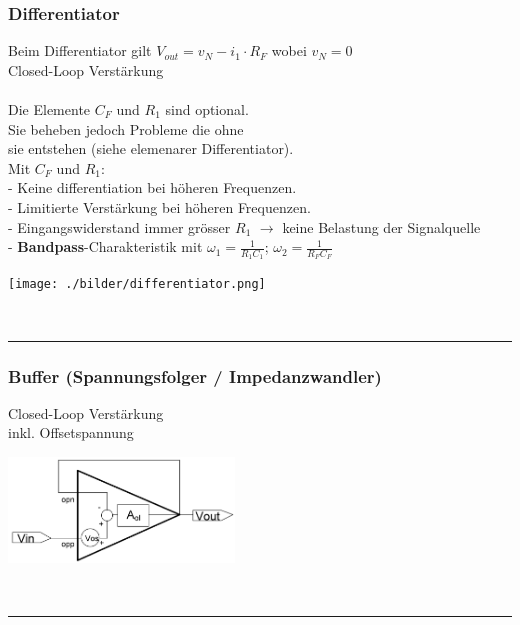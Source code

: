   \subsubsection{Differentiator}
    \begin{minipage}[T]{13cm}
      Beim Differentiator gilt $V_{out}=v_N-i_1 \cdot R_F$ wobei $v_N=0$\\
      Closed-Loop Verst\"arkung
      \hspace{3mm}\\
      \hspace*{43.2mm}\\
      Die Elemente $C_F$ und $R_1$ sind optional. \\
      Sie beheben jedoch Probleme die ohne \\
      sie entstehen (siehe elemenarer Differentiator). \\
      Mit $C_F$ und $R_1$: \\
      - Keine differentiation bei h\"oheren Frequenzen. \\
      - Limitierte Verst\"arkung bei h\"oheren Frequenzen. \\
      - Eingangswiderstand immer gr\"osser $R_1$ $\rightarrow$ keine Belastung der Signalquelle\\
      - \textbf{Bandpass}-Charakteristik mit $\omega_1 = \frac{1}{R_1C_1}$; $\omega_2 = \frac{1}{R_FC_F}$
    \end{minipage}
    \begin{minipage}{6cm}
      \texttt{[image: ./bilder/differentiator.png]}
    \end{minipage}\\

  \hrule
  \subsubsection{Buffer (Spannungsfolger / Impedanzwandler)}
    \begin{minipage}[T]{13cm}
      Closed-Loop Verst\"arkung
      \hspace{3mm}\\
      inkl. Offsetspannung
      \hspace{10.2mm}
    \end{minipage} 
    \begin{minipage}{6cm}
      \includegraphics[width=6cm]{./bilder/buffer.png} 
    \end{minipage}\\		
\hrule

